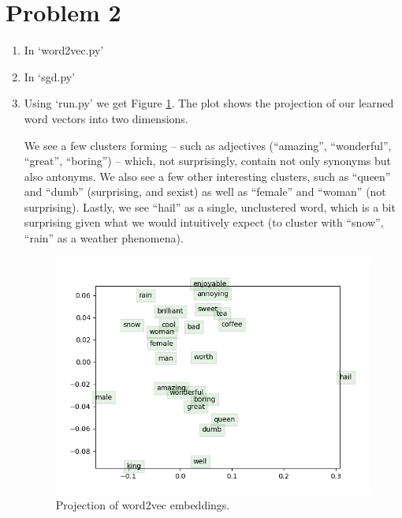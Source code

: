 \documentclass[12pt]{article}
\begin{document}
\section*{Problem 2}
\begin{enumerate}[label=(\alph*)]
  \item In `word2vec.py'
  \item In `sgd.py'
  \item Using `run.py' we get Figure \ref{fig:projection}. The plot shows the projection of our learned word vectors into two dimensions.

  We see a few clusters forming -- such as adjectives (``amazing'', ``wonderful'', ``great'', ``boring'') -- which, not surprisingly, contain not only synonyms but also antonyms. We also see a few other interesting clusters, such as ``queen'' and ``dumb'' (surprising, and sexist) as well as ``female'' and ``woman'' (not surprising). Lastly, we see ``hail'' as a single, unclustered word, which is a bit surprising given what we would intuitively expect (to cluster with ``snow'', ``rain'' as a weather phenomena).
    \begin{figure}[!h]
      \centering
      \includegraphics[]{../word_vectors.png}
      \caption{Projection of word2vec embeddings.}
      \label{fig:projection}
    \end{figure}
\end{enumerate}
\end{document}
